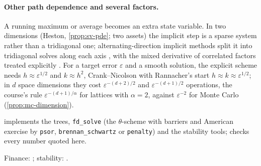 \paragraph{Other path dependence and several factors.} A running maximum or average becomes an
extra state variable. In two dimensions (Heston,
\cref{prop:sv-pde}; two assets) the implicit step is a sparse system rather than a tridiagonal one;
alternating-direction implicit methods split it into tridiagonal solves along each axis
\citep{peaceman-rachford-1955}, with the mixed derivative of correlated factors treated
explicitly \citep{craig-sneyd-1988,in-t-hout-foulon-2010}. For a target error $\varepsilon$ and a smooth
solution, the explicit scheme needs $h\approx\varepsilon^{1/2}$ and $k\approx h^2$, Crank--Nicolson with Rannacher's
start $h\approx k\approx\varepsilon^{1/2}$; in $d$ space dimensions they cost $\varepsilon^{-(d+2)/2}$ and $\varepsilon^{-(d+1)/2}$
operations, the course's rule $\varepsilon^{-(d+1)/\alpha}$ for lattices with $\alpha=2$, against $\varepsilon^{-2}$ for Monte
Carlo (\cref{prop:mc-dimension}).

\begin{incode}
 implements the trees, \texttt{fd\_solve} (the $\theta$-scheme with
barriers and American exercise by \texttt{psor}, \texttt{brennan\_schwartz} or \texttt{penalty}) and the
stability tools;  checks every number quoted here.
\end{incode}


\furtherreading
Finance: \textcite{wilmott-howison-dewynne}; stability: \textcite{strikwerda-finite-difference}.
